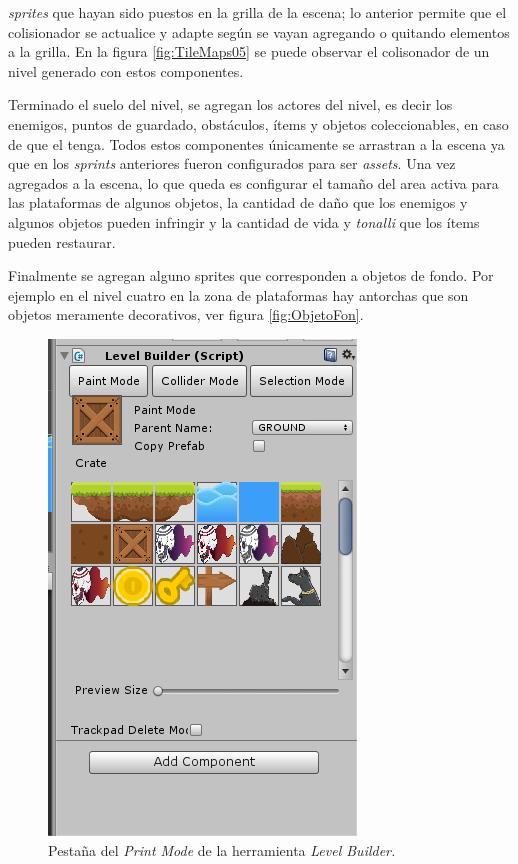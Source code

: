\textit{sprites} que hayan sido puestos en la grilla de la escena; lo anterior 
permite que el colisionador se actualice y adapte según se vayan agregando o 
quitando elementos a la grilla. En la figura \ref{fig:TileMaps05} se puede observar 
el colisonador de un nivel generado con estos componentes.
\\
\par
Terminado el suelo del nivel, se agregan los actores del nivel, es decir los 
enemigos, puntos de guardado, obstáculos, ítems y objetos coleccionables, en 
caso de que el tenga. Todos estos componentes únicamente se arrastran a la escena 
ya que en los \textit{sprints} anteriores fueron configurados para ser \textit{assets}. 
Una vez agregados a la escena, lo que queda es configurar el tamaño del area activa 
para las plataformas de algunos objetos, la cantidad de daño que los enemigos y 
algunos objetos pueden infringir y la cantidad de vida y \textit{tonalli} que los 
ítems pueden restaurar. 
\\
\par
Finalmente se agregan alguno sprites que corresponden a objetos de fondo. Por ejemplo 
en el nivel cuatro en la zona de plataformas hay antorchas que son objetos meramente 
decorativos, ver figura \ref{fig:ObjetoFon}.

\begin{figure}[h]
		\centering
		\includegraphics[height=0.2 \textheight]{03TrabajoRealizado/imagenes/levelBuilder02.png}
		\caption{Pestaña del \textit{Print Mode} de la herramienta \textit{Level 
		Builder.}}
		\label{fig:LevelBuilder}
\end{figure}

